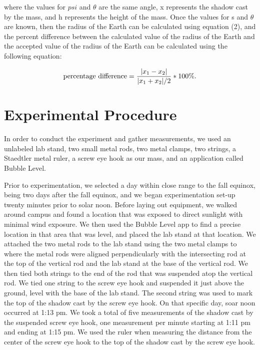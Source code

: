 \documentclass[twoside,10pt]{article}
\begin{document}
\begin{multicols}{2}
		where the values for $psi$ and $\theta$ are the same angle, x represents the shadow cast by the mass, and h represents the height of the mass. Once the values for s and $\theta$ are known, then the radius of the Earth can be calculated using equation (2), and the percent difference between the calculated value of the radius of the Earth and the accepted value of the radius of the Earth can be calculated using the following equation:
		
		\begin{small}
		\begin{equation}
		\textnormal{percentage difference} = \frac{| x_{1} - x_{2}|}{|x_1 + x_2|/2} * 100 \% .
		\end{equation}
		\end{small}
		
		\section{Experimental Procedure}
		
		\indent In order to conduct the experiment and gather measurements, we used an unlabeled lab stand, two small metal rods, two metal clamps, two strings, a Staedtler metal ruler, a screw eye hook as our mass, and an application called Bubble Level. 

		\indent Prior to experimentation, we selected a day within close range to the fall equinox, being two days after the fall equinox, and we began experimentation set-up twenty minutes prior to solar noon. Before laying out equipment, we walked around campus and found a location that was exposed to direct sunlight with minimal wind exposure. We then used the Bubble Level app to find a precise location in that area that was level, and placed the lab stand at that location. We attached the two metal rods to the lab stand using the two metal clamps to where the metal rods were aligned perpendicularly with the intersecting rod at the top of the vertical rod and the lab stand at the base of the vertical rod. We then tied both strings to the end of the rod that was suspended atop the vertical rod. We tied one string to the screw eye hook and suspended it just above the ground, level with the base of the lab stand. The second string was used to mark the top of the shadow cast by the screw eye hook. On that specific day, soar noon occurred at 1:13 pm. We took a total of five measurements of the shadow cast by the suspended screw eye hook, one measurement per minute starting at 1:11 pm and ending at 1:15 pm. We used the ruler when measuring the distance from the center of the screw eye hook to the top of the shadow cast by the screw eye hook. 


\end{multicols}
\end{document}
